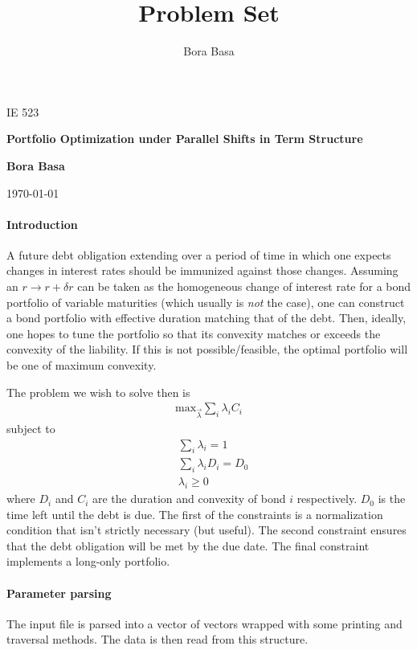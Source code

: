 \documentclass[12pt]{article}
\title{Problem Set \HWNO}
\author{Bora Basa}
\newcommand{\CLASS}{IE 523}
\begin{document}
\begin{titlepage}
    \setlength{\parindent}{0pt}
    \vspace*{-3.8\baselineskip}
    \CLASS
    \begin{center}
    \vspace{.1\textheight}
    {\huge\bfseries Portfolio Optimization under Parallel Shifts in Term Structure \par}
    \bigbreak
    {\bfseries\large Bora Basa\par}
    \bigbreak
    \today
\end{center}
\end{titlepage}
\paragraph{Introduction}

A future debt obligation extending over a period of time in which one expects changes in interest rates should be immunized against those changes. Assuming an $r\to r+\delta r$ can be taken as the homogeneous change of interest rate for a bond portfolio of variable maturities (which usually is \emph{not} the case), one can construct a bond portfolio with effective duration matching that of the debt. Then, ideally, one hopes to tune the portfolio so that its convexity matches or exceeds the convexity of the liability. If this is not possible/feasible, the optimal portfolio will be one of maximum convexity. 

The problem we wish to solve then is 
\begin{align*}
   \text{max}_{\vec\lambda} \sum_i\lambda_i C_i 
\end{align*}
subject to 
\begin{align*}
   &\sum_i\lambda_i = 1 \\
   &\sum_i \lambda_i D_i = D_0\\
   &\lambda_i\geq 0
\end{align*}
where $D_i$ and $C_i$ are the duration and convexity of bond $i$ respectively. $D_0$ is the time left until the debt is due. The first of the constraints is a normalization condition that isn't strictly necessary (but useful). The second constraint ensures that the debt obligation will be met by the due date. The final constraint implements a long-only portfolio. 

\paragraph{Parameter parsing} The input file is parsed into a vector of vectors wrapped with some printing and traversal methods. The data is then read from this structure.
\end{document}

